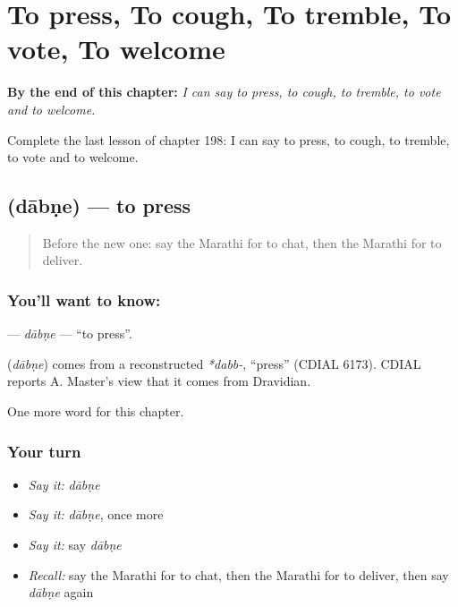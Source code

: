 
\chapter{To press, To cough, To tremble, To vote, To welcome}
\label{ch:mr-to-press-to-cough-to-tremble-to-vote-to-welcome}

\begin{chapteropening}
\textbf{By the end of this chapter:} \emph{I can say to press, to cough, to tremble, to vote and to welcome.}

Complete the last lesson of chapter 198: I can say to press, to cough, to tremble, to vote and to welcome.
\end{chapteropening}

\section[\texorpdfstring{\mr{दाबणे} (dābṇe)}{दाबणे (dābṇe)}]{ (dābṇe) — to press}

\label{lesson:MR-C198-dabne}



\begin{quote}
Before the new one: say the Marathi for to chat, then the Marathi for to deliver.
\end{quote}

\subsection*{You'll want to know: }
\textbf{} — \emph{dābṇe} — \textquotedblleft{}to press\textquotedblright{}.

\begin{cousinweb}
\textbf{} (\emph{dābṇe}) comes from a reconstructed \emph{*dabb-}, \textquotedblleft{}press\textquotedblright{} (CDIAL 6173). CDIAL reports A. Master's view that it comes from Dravidian.
\end{cousinweb}

\begin{grammarlens}[title={What you've built}]
One more word for this chapter.
\end{grammarlens}

\subsection*{Your turn}
\begin{itemize}
\raggedright
  \item \emph{Say it:} \emph{dābṇe}
  \item \emph{Say it:} \emph{dābṇe}, once more
  \item \emph{Say it:} say \emph{dābṇe}
  \item \emph{Recall:} say the Marathi for to chat, then the Marathi for to deliver, then say \emph{dābṇe} again
\end{itemize}

